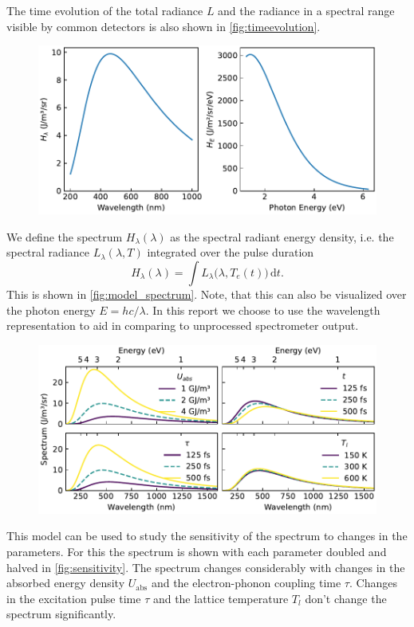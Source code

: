 \documentclass[
	a4paper,
]{scrarticle}
\begin{document}
The time evolution of the total radiance $L$ and the radiance in a spectral range visible by common detectors is also shown in \autoref{fig:timeevolution}.

\begin{figure}
    \centering
    \includegraphics{../analysis/figures/model.spectrum.pdf}
    \caption{}
    \label{fig:model_spectrum}
\end{figure}

We define the spectrum $H_\lambda(\lambda)$ as the spectral radiant energy density, i.e. the spectral radiance $L_\lambda(\lambda, T)$ integrated over the pulse duration
\begin{equation}
      H_\lambda(\lambda) = 
      \int L_\lambda\bigl(\lambda, T_e(t)\bigr)\,\mathrm dt.
\end{equation}
This is shown in \autoref{fig:model_spectrum}.
Note, that this can also be visualized over the photon energy $E = h c / \lambda$. In this report we choose to use the wavelength representation to aid in comparing to unprocessed spectrometer output.


\begin{figure}
    \centering
    \includegraphics{../analysis/figures/sensitivity.pdf}
    \caption{}
    \label{fig:sensitivity}
\end{figure}
This model can be used to study the sensitivity of the spectrum to changes in the parameters. For this the spectrum is shown with each parameter doubled and halved in \autoref{fig:sensitivity}.
The spectrum changes considerably with changes in the absorbed energy density $U_\text{abs}$ and the electron-phonon coupling time $\tau$. Changes in the excitation pulse time $\tau$ and the lattice temperature $T_l$ don't change the spectrum significantly.
\end{document}
